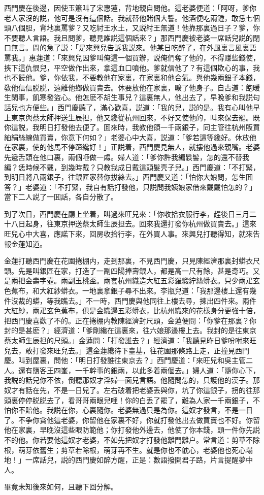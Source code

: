 西門慶在後邊，因使玉簫叫了宋惠蓮，背地親自問他。這老婆便道：「阿呀，爹你老人家沒的説，他可是沒有這個話。我就替他賭個大誓。他酒便吃兩鍾，敢恁七個頭八個胆，背地裏罵爹？又吃紂王水土，又説紂王無道！他靠那裏過日子？爹，你不要聽人言語。我且問爹，聽見誰説這個話來？」那西門慶被老婆一席話兒説的閉口無言。問的急了説：「是來興兒告訴我説來。他某日吃醉了，在外風裏言風裏語罵我。」惠蓮道：「來興兒因爹叫俺這一個買辦，説俺們奪了他的，不得赚些錢使，挾下這仇恨兒，平空做作出來，拿這血口噴他。爹就信他了？有這個欺心的事，我也不饒他。爹，你依我，不要教他在家裏，在家裏和他合氣。與他幾兩銀子本錢，敎他信信脱脱，遠離他鄉做買賣去。休要放他在家裏，曠了他身子。自古道：飽暖生閑事，飢寒發盜心。他怎麽不胡生事兒？這裏無人，他出去了，早晚爹和我説句話兒也方便些。」西門慶聽了，滿心歡喜，説道：「我的兒，説的是。我有心叫他早上東京與蔡太師押送生辰担，他又纔從杭州回來，不好又使他的，叫來保去罷。既你這説，我明日打發他去便了。囬來時，我教他領一千兩銀子，同主管往杭州販買紬絹絲線做買賣，你意下何如？」老婆心中大喜，説道：「爹若這等纔好。休放他在家裏，使的他馬不停蹄纔好！」正説着，西門慶見無人，就摟他過來親嘴。老婆先遞舌頭在他口裏，兩個咂做一䖏。婦人道：「爹你許我編䯼髻，怎的還不替我編？恁時候不戴，到幾時戴？只教我成日戴這頭髮壳子兒。」西門慶道：「不打緊，到明日將八兩銀子，往銀匠家替你拔絲去。」西門慶又道：「怕你大娘問，怎生囬答？」老婆道：「不打緊，我自有話打發他，只説問我姨娘家借來戴戴怕怎的？」當下二人説了一囬話，各自分散了。

到了次日，西門慶在廳上坐着，叫過來旺兒來：「你收拾衣服行李，趕後日三月二十八日起身，往東京押送蔡太師生辰担去。回來我還打發你杭州做買賣去。」這來旺兒心中大喜，應諾下來，回房收拾行李，在外買人事。來興兒打聽得知，就來告報金蓮知道。

金蓮打聽西門慶在花園捲棚内，走到那裏，不見西門慶，只見陳經濟那裏封蟒衣尺頭。先是叫銀匠在家，打造了一副四陽捧壽銀人，都是高一尺有餘，甚是奇巧。又是兩把金壽字壺。兩副玉桃盃。兩套杭州織造大紅五彩羅緞紵絲蟒衣。只少兩疋玄色蕉布，和大紅紗蟒衣。一地裏拿銀子尋不出來。李瓶兒道：「我那邊樓上還有幾件沒裁的蟒，等我瞧去。」不一時，西門慶與他同往上樓去尋，揀出四件來。兩件大紅紗，兩疋玄色蕉布，俱是金織邊五彩蟒衣，比杭州織來的花樣身分更強十倍，把西門慶喜歡了不的。正在捲棚内教陳經濟封尺頭，金蓮便問：「你爹在那裏？你封的是甚麽？」經濟道：「爹剛纔在這裏來，往六娘那邊樓上去。我封的是往東京蔡太師生辰担的尺頭。」金蓮問：「打發誰去？」經濟道：「我聽見昨日爹吩咐來旺兒去，敢打發來旺兒去。」這金蓮纔待下臺基，往花園那條路上走，正撞見西門慶。叫到屋裏，問他：「明日打發誰往東京去？」西門慶道：「來旺兒和吳主管二人。還有鹽客王四峯，一千幹事的銀兩，以此多着兩個去。」婦人道：「隨你心下，我説的話兒你不依，倒聽那奴才淫婦一面兒言語。他隨問怎的，只護他的漢子。那奴才有話在先，不是一日兒了。左右破着把老婆丢與你，坑了你這銀子，拐的往那頭裏停停脱脱去了，看哥哥兩眼兒哩！你的白丢了罷了，難為人家一千兩銀子，不怕你不賠他。我説在你，心裏隨你。老婆無過只是為你。這奴才發言，不是一日了。不争你貪他這老婆，你留他在家裏不好，你就打發他出去做買賣也不好。你留他在家裏，早晚沒這些眼防範他；你打發他外邊去，他使了你本錢，頭一件你先説不的他。你若要他這奴才老婆，不如先把奴才打發他離門離户。常言道：剪草不除根，萌芽依舊生；剪草若除根，萌芽再不生。就是你也不躭心，老婆他也死心塌地！」一席話兒，説的西門慶如醉方醒，正是：數語撥開君子路，片言提醒夢中人。

畢竟未知後來如何，且聽下回分解。

